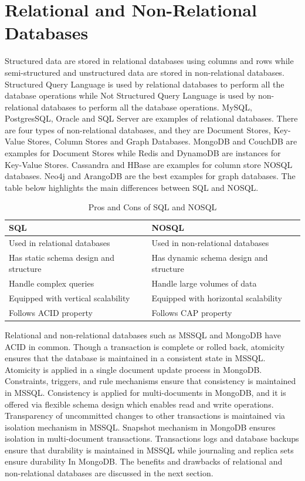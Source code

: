 \documentclass[a4Paper,12pt]{report}
\begin{document}
\section{Relational and Non-Relational Databases}
Structured data are stored in relational databases using columns and rows while semi-structured and unstructured data are stored in non-relational databases. Structured Query Language is used by relational databases to perform all the database operations while Not Structured Query Language is used by non-relational databases to perform all the database operations. MySQL, PostgresSQL, Oracle and SQL Server are examples of relational databases. There are four types of non-relational databases, and they are Document Stores, Key-Value Stores, Column Stores and Graph Databases. MongoDB and CouchDB are examples for Document Stores while Redis and DynamoDB are instances for Key-Value Stores. Cassandra and HBase are examples for column store NOSQL databases. Neo4j and ArangoDB are the best examples for graph databases. The table below highlights the main differences between SQL and NOSQL.
\begin{table}[H]
\centering
\begin{tabularx}{\textwidth}{XX}\hline
SQL & NOSQL\\\hline
Used in relational databases & Used in non-relational databases\\
Has static schema design and structure & Has dynamic schema design and structure\\
Handle complex queries & Handle large volumes of data\\
Equipped with vertical scalability & Equipped with horizontal scalability\\
Follows ACID property & Follows CAP property\\\hline
\end{tabularx}
\caption{Pros and Cons of SQL and NOSQL}
\end{table}
Relational and non-relational databases such as MSSQL and MongoDB have ACID in common. Though a transaction is complete or rolled back, atomicity ensures that the database is maintained in a consistent state in MSSQL. Atomicity is applied in a single document update process in MongoDB. Constraints, triggers, and rule mechanisms ensure that consistency is maintained in MSSQL. Consistency is applied for multi-documents in MongoDB, and it is offered via flexible schema design which enables read and write operations. Transparency of uncommitted changes to other transactions is maintained via isolation mechanism in MSSQL. Snapshot mechanism in MongoDB ensures isolation in multi-document transactions. Transactions logs and database backups ensure that durability is maintained in MSSQL while journaling and replica sets ensure durability In MongoDB. The benefits and drawbacks of relational and non-relational databases are discussed in the next section.
\end{document}
